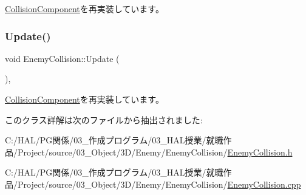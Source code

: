 \mbox{\hyperlink{class_collision_component_aa75440061f7a60e8c4ee1dae18682cc0}{Collision\+Component}}を再実装しています。

\mbox{\label{class_enemy_collision_ab54133504d867c6d2070d2f3854a0aaf}} 
\subsubsection{\texorpdfstring{Update()}{Update()}}
{\footnotesize\ttfamily void Enemy\+Collision\+::\+Update (\begin{DoxyParamCaption}{ }\end{DoxyParamCaption})\hspace{0.3cm}{\ttfamily [override]}, {\ttfamily [virtual]}}



\mbox{\hyperlink{class_collision_component_a3fa60fd8b4e8690f783c0f578949664e}{Collision\+Component}}を再実装しています。



このクラス詳解は次のファイルから抽出されました\+:\begin{DoxyCompactItemize}
\item 
C\+:/\+H\+A\+L/\+P\+G関係/03\+\_\+作成プログラム/03\+\_\+\+H\+A\+L授業/就職作品/\+Project/source/03\+\_\+\+Object/3\+D/\+Enemy/\+Enemy\+Collision/\mbox{\hyperlink{_enemy_collision_8h}{Enemy\+Collision.\+h}}\item 
C\+:/\+H\+A\+L/\+P\+G関係/03\+\_\+作成プログラム/03\+\_\+\+H\+A\+L授業/就職作品/\+Project/source/03\+\_\+\+Object/3\+D/\+Enemy/\+Enemy\+Collision/\mbox{\hyperlink{_enemy_collision_8cpp}{Enemy\+Collision.\+cpp}}\end{DoxyCompactItemize}
